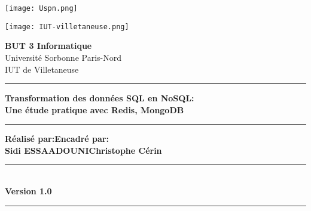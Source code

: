\begin{titlepage}
  \parbox{0.2\linewidth}{\texttt{[image: Uspn.png]}}
  \hspace{9cm}
  \parbox{0.2\linewidth}{\texttt{[image: IUT-villetaneuse.png]}}
  
  \vspace{2cm}
  \begin{center}
    \textbf{BUT 3 Informatique}\\
    \vspace{1cm}
    \large{Université Sorbonne Paris-Nord}\\
    \vspace{0.2cm}
    \large{IUT de Villetaneuse}
  \end{center}
  
  \vspace{1.5cm}
  
  \begin{center}
    \rule{0.9\textwidth}{3pt}
    \huge{\textbf{Transformation des données SQL en NoSQL:}}\\
    \huge{\textbf{Une étude pratique avec Redis, MongoDB}}\\
    \rule{0.9\textwidth}{3pt}
  \end{center}
  
  \vspace{3cm}
  
  \begin{large}
    \begin{flushleft}
      \hspace{1cm}\textbf{Réalisé par:}\hspace{9.5cm}\textbf{Encadré par:}\\
      \vspace{0.25cm}
      \hspace{1cm}\textbf{Sidi ESSAADOUNI}\hspace{8cm}\textbf{Christophe Cérin}
    \end{flushleft}
  \end{large}
  
  \vspace{3cm}
  
  \begin{center}
    \rule{0.6\textwidth}{3pt}\\
    \huge{\textbf{Version 1.0}}\\
    \rule{0.6\textwidth}{3pt}
  \end{center}
\end{titlepage}

